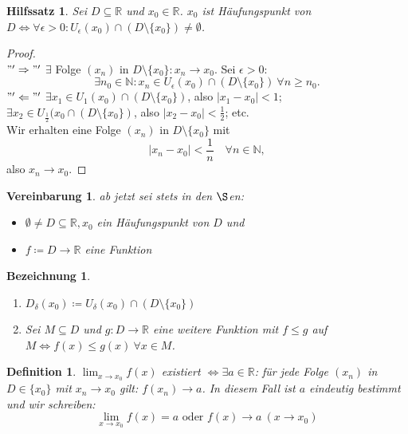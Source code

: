 \documentclass{extreport}
\newcommand{\N}{\mathbb{N}}
\newcommand{\R}{\mathbb{R}}
\theoremstyle{named}
\theoremstyle{dotless}
\newtheorem{hilfssatz}[namedtheorem]{Hilfssatz}
\newtheorem*{bezeichnung}{Bezeichnung}
\newtheorem*{definition}{Definition}
\newtheorem*{vereinbarung}{Vereinbarung}
\begin{document}
\begin{hilfssatz} \label{6.1:hsatz}
	Sei $D \subseteq \R$ und $x_{0} \in \R$. $x_{0}$ ist Häufungspunkt von $D \iff \forall \epsilon > 0: U_{\epsilon}(x_{0}) \cap (D \setminus \{ x_{0} \}) \neq \emptyset$.
\end{hilfssatz}

\begin{proof} ~\\
	$"'\Rightarrow"'$ $\exists$ Folge $(x_{n})$ in $D \setminus \{ x_{0} \} : x_{n} \rightarrow x_{0}$. Sei $\epsilon > 0$: 
	$$ \exists n_{0} \in \N: x_{n} \in U_{\epsilon}(x_{0}) \cap (D \setminus \{ x_{0} \}) ~\forall n \geq n_{0}. $$
	$"'\Leftarrow"'$ $\exists x_{1} \in U_{1}(x_{0}) \cap (D \setminus \{ x_{0} \})$, also $|x_{1} - x_{0}| < 1$; \\
	$\exists x_{2} \in U_{\frac{1}{2}}(x_{0} \cap (D \setminus \{ x_{0} \})$, also $|x_{2} - x_{0}| < \frac{1}{2}$; etc. \\
	Wir erhalten eine Folge $(x_{n})$ in $D \setminus \{ x_{0} \}$ mit 
	$$ |x_{n} - x_{0}| < \frac{1}{n} \quad \forall n \in \N, $$
	also $x_{n} \rightarrow x_{0}$.
\end{proof}


\begin{vereinbarung}
	ab jetzt sei stets in den $\S$en:
	\begin{itemize}
		\item $\emptyset \neq D \subseteq \R, x_{0}$ ein Häufungspunkt von $D$ und
		\item $f \coloneqq D \rightarrow \R$ eine Funktion	
	\end{itemize}
\end{vereinbarung}


\begin{bezeichnung} ~\
	\begin{enumerate}
		\item $D_{\delta}(x_{0}) \coloneqq U_{\delta}(x_{0}) \cap (D \setminus \{ x_{0} \})$
		\item Sei $M \subseteq D$ und $g \colon D \rightarrow \R$ eine weitere Funktion mit $f \leq g$ auf $M \iff f(x) \leq g(x) ~\forall x \in M$.
	\end{enumerate}
\end{bezeichnung}


\begin{definition}
	$\lim_{x \rightarrow x_{0}} f(x)$ existiert $\iff \exists a \in \R$: für jede Folge $(x_{n})$ in $D \in \{ x_{0} \}$ mit $x_{n} \rightarrow x_{0}$ gilt: $f(x_{n}) \rightarrow a$.
	In diesem Fall ist $a$ eindeutig bestimmt und wir schreiben:
		$$ \lim_{x \rightarrow x_{0}} f(x) = a \text{ oder } f(x) \rightarrow a ~(x \rightarrow x_{0}) $$
\end{definition}
\end{document}
